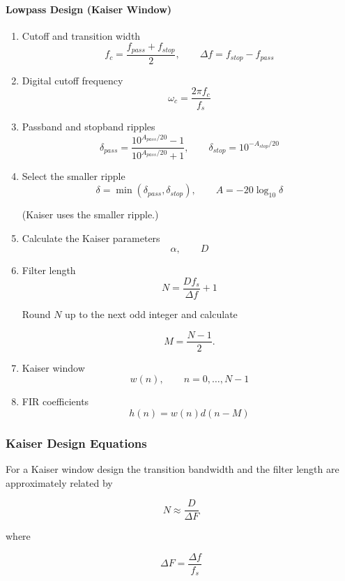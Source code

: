 \paragraph{Lowpass Design (Kaiser Window)}

\begin{enumerate}
\item Cutoff and transition width
\[
f_c=\frac{f_{pass}+f_{stop}}{2},
\qquad
\Delta f=f_{stop}-f_{pass}
\]

\item Digital cutoff frequency
\[
\omega_c=\frac{2\pi f_c}{f_s}
\]

\item Passband and stopband ripples
\[
\delta_{pass}=
\frac{10^{A_{pass}/20}-1}
{10^{A_{pass}/20}+1},
\qquad
\delta_{stop}=10^{-A_{stop}/20}
\]

\item Select the smaller ripple
\[
\delta=\min(\delta_{pass},\delta_{stop}),
\qquad
A=-20\log_{10}\delta
\]

(Kaiser uses the smaller ripple.)

\item Calculate the Kaiser parameters
\[
\alpha,\qquad D
\]

\item Filter length
\[
N=\frac{Df_s}{\Delta f}+1
\]

Round $N$ up to the next odd integer and calculate

\[
M=\frac{N-1}{2}.
\]

\item Kaiser window
\[
w(n),\qquad n=0,\ldots,N-1
\]

\item FIR coefficients
\[
h(n)=w(n)d(n-M)
\]

\end{enumerate}

\subsubsection{Kaiser Design Equations}

For a Kaiser window design the transition bandwidth and the filter
length are approximately related by

\[
\boxed{
N
\approx
\frac{D}{\Delta F}
}
\]

where

\[
\Delta F
=
\frac{\Delta f}{f_s}
\]

